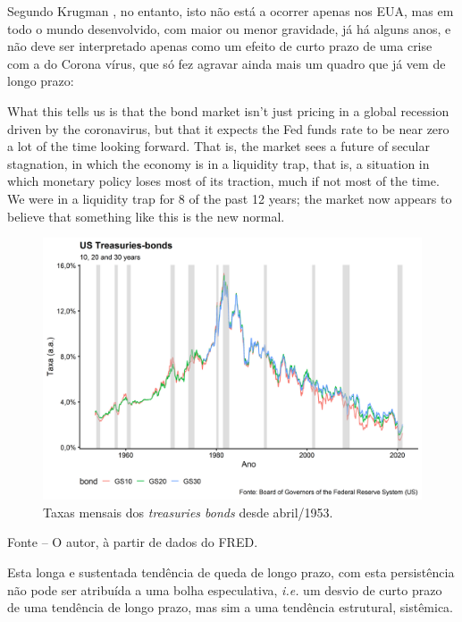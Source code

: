\documentclass[
	12pt,				%
	oneside,			%
	a4paper,			%
	chapter=TITLE,		%
	section=TITLE,		%
	english,			%
	brazil				%
	]{abntex2}
\newcommand{\bcenter}{\begin{center}}
\newcommand{\ecenter}{\end{center}}
\begin{document}
\begin{refsection}
Segundo Krugman \autocite*{krugman2020}, no entanto, isto não está a ocorrer apenas nos
\gls{EUA}, mas em todo o mundo desenvolvido, com maior ou menor gravidade, já há
alguns anos, e não deve ser interpretado apenas como um efeito de curto prazo
de uma crise com a do Corona vírus, que só fez agravar ainda mais um quadro
que já vem de longo prazo:
\begin{citacao}
What this tells us is that the bond market isn’t just pricing in a global
recession driven by the coronavirus, but that it expects the Fed funds rate to
be near zero a lot of the time looking forward. That is, the market sees a
future of secular stagnation, in which the economy is in a liquidity trap, that
is, a situation in which monetary policy loses most of its traction, much if not
most of the time. We were in a liquidity trap for 8 of the past 12 years; the
market now appears to believe that something like this is the new normal.
\end{citacao}
\begin{figure}[H]

{\centering \includegraphics[width=\textwidth]{images/fred-1} 

}

\caption{Taxas mensais dos \emph{treasuries bonds} desde abril/1953.}\label{fig:fred}
\end{figure}
\bcenter

\small Fonte -- O autor, à partir de dados do \gls{FRED}.
\ecenter

Esta longa e sustentada tendência de queda de longo prazo, com esta persistência
não pode ser atribuída a uma bolha especulativa, \emph{i.e.} um desvio de curto prazo
de uma tendência de longo prazo, mas sim a uma tendência estrutural, sistêmica.


\end{refsection}
\end{document}
